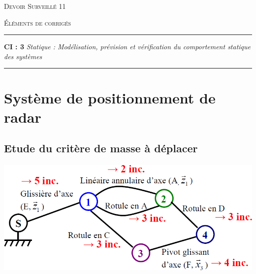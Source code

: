 \documentclass[10pt,oneside]{article}
\begin{document}
\pagestyle{fancy}
\renewcommand{\headrulewidth}{0.2pt}

\fancyhead{}


\renewcommand{\footrulewidth}{0.2pt}
\fancyfoot[C]{\bfseries \thepage}




\vspace{1cm}

\begin{center}
 \huge\textsc{Devoir Surveillé 11}

\vspace{1cm}

 \large\textsc{Éléments de corrigés}
\end{center}

\vspace{1cm}


\noindent\rule{\linewidth}{.2pt}
\begin{center}
 \large\textbf{CI : 3} \textit{Statique : Modélisation, prévision et vérification du comportement statique des systèmes}

\end{center}
\noindent\rule{\linewidth}{.2pt}



\section{Système de positionnement de radar}
\subsection*{Etude du critère de masse à déplacer}

\paragraph{}
\begin{center}
\includegraphics[width=.6\textwidth]{png/img1}
\end{center}
\end{document}
